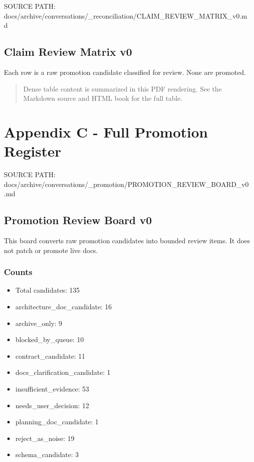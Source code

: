 \documentclass[11pt,a4paper]{report}
\begin{document}
{\small\raggedright SOURCE PATH: docs/\allowbreak{}archive/\allowbreak{}conversations/\allowbreak{}\_\allowbreak{}reconciliation/\allowbreak{}CLAIM\_\allowbreak{}REVIEW\_\allowbreak{}MATRIX\_\allowbreak{}v0.md\par}


\section{Claim Review Matrix v0}

Each row is a raw promotion candidate classified for review. None are promoted.


\begin{quote}\small Dense table content is summarized in this PDF rendering. See the Markdown source and HTML book for the full table.\end{quote}


\chapter{Appendix C - Full Promotion Register}


{\small\raggedright SOURCE PATH: docs/\allowbreak{}archive/\allowbreak{}conversations/\allowbreak{}\_\allowbreak{}promotion/\allowbreak{}PROMOTION\_\allowbreak{}REVIEW\_\allowbreak{}BOARD\_\allowbreak{}v0.md\par}


\section{Promotion Review Board v0}

This board converts raw promotion candidates into bounded review items. It does not patch or promote live docs.


\subsection{Counts}

\begin{itemize}
\item Total candidates: 135
\item architecture\_doc\_candidate: 16
\item archive\_only: 9
\item blocked\_by\_queue: 10
\item contract\_candidate: 11
\item docs\_clarification\_candidate: 1
\item insufficient\_evidence: 53
\item needs\_user\_decision: 12
\item planning\_doc\_candidate: 1
\item reject\_as\_noise: 19
\item schema\_candidate: 3
\end{itemize}
\end{document}
